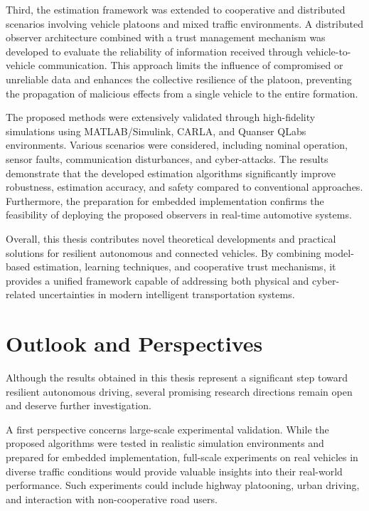 Third, the estimation framework was extended to cooperative and distributed scenarios involving vehicle platoons and mixed traffic environments. A distributed observer architecture combined with a trust management mechanism was developed to evaluate the reliability of information received through vehicle-to-vehicle communication. This approach limits the influence of compromised or unreliable data and enhances the collective resilience of the platoon, preventing the propagation of malicious effects from a single vehicle to the entire formation.

The proposed methods were extensively validated through high-fidelity simulations using MATLAB/Simulink, CARLA, and Quanser QLabs environments. Various scenarios were considered, including nominal operation, sensor faults, communication disturbances, and cyber-attacks. The results demonstrate that the developed estimation algorithms significantly improve robustness, estimation accuracy, and safety compared to conventional approaches. Furthermore, the preparation for embedded implementation confirms the feasibility of deploying the proposed observers in real-time automotive systems.

Overall, this thesis contributes novel theoretical developments and practical solutions for resilient autonomous and connected vehicles. By combining model-based estimation, learning techniques, and cooperative trust mechanisms, it provides a unified framework capable of addressing both physical and cyber-related uncertainties in modern intelligent transportation systems.

\section{Outlook and Perspectives}

Although the results obtained in this thesis represent a significant step toward resilient autonomous driving, several promising research directions remain open and deserve further investigation.

A first perspective concerns large-scale experimental validation. While the proposed algorithms were tested in realistic simulation environments and prepared for embedded implementation, full-scale experiments on real vehicles in diverse traffic conditions would provide valuable insights into their real-world performance. Such experiments could include highway platooning, urban driving, and interaction with non-cooperative road users.

